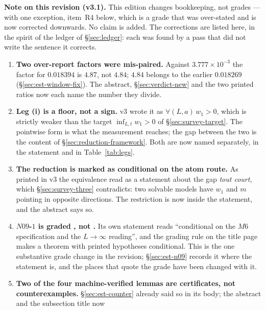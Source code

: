 \documentclass[11pt,a4paper]{article}
\newcommand{\labb}[2]{\fcolorbox{#1!35}{#1!8}{\textcolor{#1}{\textbf{\scriptsize #2}}}}
\newcommand{\LT}{\labb{cT}{T}}
\newcommand{\LC}{\labb{cC}{C}}
\newcounter{claim}
\begin{document}
\begin{v3box}
\textbf{Note on this revision (v3.1).} This edition changes bookkeeping, not grades --- with one
exception, item~R4 below, which is a grade that was over-stated and is now corrected downwards. No
claim is added. The corrections are listed here, in the spirit of the ledger of
\S\ref{sec:ledger}: each was found by a pass that did not write the sentence it corrects.

\begin{enumerate}[label=\textbf{R\arabic*.},leftmargin=2.8em,itemsep=2pt,topsep=3pt]
\item \textbf{Two over-report factors were mis-paired.} Against $3.777\times10^{-3}$ the factor for
      $0.018394$ is $4.87$, not $4.84$; $4.84$ belongs to the earlier $0.018269$
      (\S\ref{sec:est-window-fix}). The abstract, \S\ref{sec:verdict-new} and the two printed ratios
      now each name the number they divide.
\item \textbf{Leg (i) is a floor, not a sign.} v3 wrote it as $\forall(L,a)\,w_1>0$, which is
      strictly weaker than the target $\inf_{L,t}w_1>0$ of \S\ref{sec:survey-target}. The pointwise
      form is what the measurement reaches; the gap between the two is the content of
      \S\ref{sec:reduction-framework}. Both are now named separately, in the statement and in
      Table~\ref{tab:legs}.
\item \textbf{The reduction is marked as conditional on the atom route.} As printed in v3 the
      equivalence read as a statement about the gap \emph{tout court}, which \S\ref{sec:survey-three}
      contradicts: two solvable models have $w_1$ and $m$ pointing in opposite directions. The
      restriction is now inside the statement, and the abstract says so.
\item \textbf{$N09$-$1$ is graded \LC, not \LT.} Its own statement reads ``conditional on the $M6$
      specification and the $L\to\infty$ reading'', and the grading rule on the title page makes a
      theorem with printed hypotheses conditional. This is the one substantive grade change in the
      revision; \S\ref{sec:est-n09} records it where the statement is, and the places that quote the
      grade have been changed with it.
\item \textbf{Two of the four machine-verified lemmas are certificates, not counterexamples.}
      \S\ref{sec:est-counter} already said so in its body; the abstract and the subsection title now

\end{enumerate}
\end{v3box}
\end{document}
